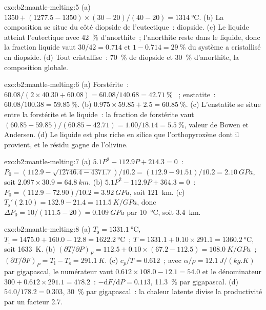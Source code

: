\begin{solution}{exo:b2:mantle-melting:5}
(a) $1350 + (1277.5 - 1350)\times(30 - 20)/(40 - 20) = \qty{1314}{\celsius}$.
(b) La composition se situe du côté diopside de l'eutectique~: diopside.
(c) Le liquide atteint l'eutectique avec \qty{42}{\percent} d'anorthite~; l'anorthite
reste dans le liquide, donc la fraction liquide vaut $30/42 = 0.714$ et $1 - 0.714 =
\qty{29}{\percent}$ du système a cristallisé en diopside. (d) Tout cristallise~:
\qty{70}{\percent} de diopside et \qty{30}{\percent} d'anorthite, la
composition globale.
\end{solution}

\begin{solution}{exo:b2:mantle-melting:6}
(a) Forstérite~: $60.08/(2\times40.30 + 60.08) = 60.08/140.68 =
\qty{42.71}{\percent}$ ~; enstatite~: $60.08/100.38 = \qty{59.85}{\percent}$.
(b) $0.975\times59.85 + 2.5 = \qty{60.85}{\percent}$. (c) L'enstatite se situe entre
la forstérite et le liquide~: la fraction de forstérite vaut $(60.85 - 59.85)/(60.85 -
42.71) = 1.00/18.14 = \qty{5.5}{\percent}$, valeur de Bowen et Andersen. (d) Le
liquide est plus riche en silice que l'orthopyroxène dont il provient, et le résidu
gagne de l'olivine.
\end{solution}

\begin{solution}{exo:b2:mantle-melting:7}
(a) $5.1P^2 - 112.9P + 214.3 = 0$~: $P_0 = (112.9 - \sqrt{12746.4 -
4371.7})/10.2 = (112.9 - 91.51)/10.2 = \qty{2.10}{GPa}$, soit $2.097\times30.9 =
\qty{64.8}{km}$. (b) $5.1P^2 - 112.9P + 364.3 = 0$~: $P_0 = (112.9 -
72.90)/10.2 = \qty{3.92}{GPa}$, soit \qty{121}{km}. (c) $T_{\mathrm s}'(2.10) = 132.9
- 21.4 = \qty{111.5}{K/GPa}$, donc $\Delta P_0 = 10/(111.5 - 20) = \qty{0.109}{GPa}$
par \qty{10}{\celsius}, soit \qty{3.4}{km}.
\end{solution}

\begin{solution}{exo:b2:mantle-melting:8}
(a) $T_{\mathrm s} = \qty{1331.1}{\celsius}$, $T_{\mathrm l} = 1475.0 + 160.0 -
12.8 = \qty{1622.2}{\celsius}$~; $T = 1331.1 + 0.10\times291.1 =
\qty{1360.2}{\celsius}$, soit \qty{1633}{K}. (b) $(\partial T/\partial P)_F = 112.5
+ 0.10\times(67.2 - 112.5) = \qty{108.0}{K/GPa}$~; $(\partial T/\partial F)_P =
T_{\mathrm l} - T_{\mathrm s} = \qty{291.1}{K}$. (c) $c_p/T = 0.612$~; avec $\alpha/\rho
= \qty{12.1}{J/(kg.K)}$ par gigapascal, le numérateur vaut $0.612\times108.0 - 12.1
= 54.0$ et le dénominateur $300 + 0.612\times291.1 = 478.2$~: $-\mathrm dF/\mathrm
dP = 0.113$, \qty{11.3}{\percent} par gigapascal. (d) $54.0/178.2 = 0.303$,
\qty{30}{\percent} par gigapascal~: la chaleur latente divise la productivité par
un facteur 2.7.
\end{solution}

